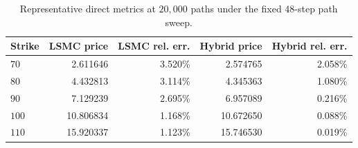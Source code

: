 \begin{table}[htbp]
\centering
\caption{Representative direct metrics at $20{,}000$ paths under the fixed 48-step path sweep.}
\label{tab:bgk_r02_calibrated_t1_nex12-path48-path20k}
\begin{tabular}{lrrrr}
\toprule
Strike & LSMC price & LSMC rel. err. & Hybrid price & Hybrid rel. err. \\
\midrule
$70$ & 2.611646 & 3.520\% & 2.574765 & 2.058\% \\
$80$ & 4.432813 & 3.114\% & 4.345363 & 1.080\% \\
$90$ & 7.129239 & 2.695\% & 6.957089 & 0.216\% \\
$100$ & 10.806834 & 1.168\% & 10.672650 & 0.088\% \\
$110$ & 15.920337 & 1.123\% & 15.746530 & 0.019\% \\
\bottomrule
\end{tabular}
\end{table}

